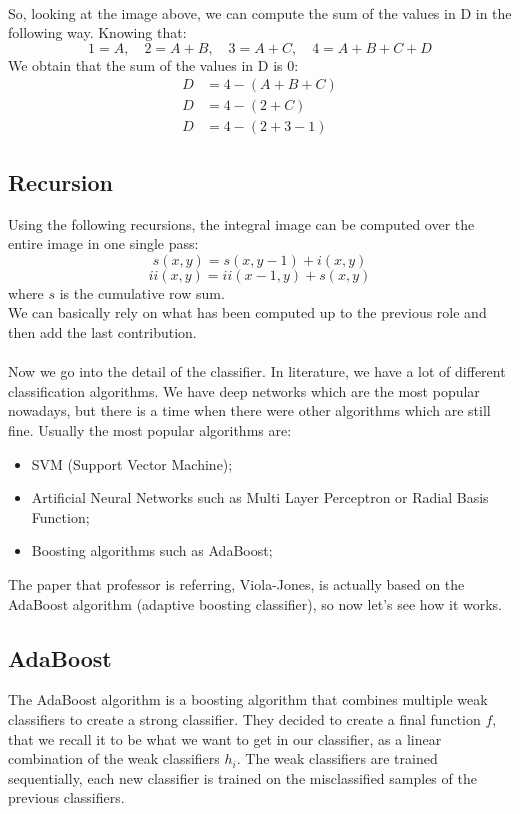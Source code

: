 \\So, looking at the image above, we can compute the sum of the values in D in the following way.
Knowing that: 
\[1 = A,\quad 2 = A + B,\quad 3 = A + C,\quad 4 = A + B + C + D\]
We obtain that the sum of the values in D is $0$:
\begin{equation}
    \begin{split}
        D & = 4 - (A + B + C) \\
        D & = 4 - (2 + C) \\
        D & = 4 - (2 + 3 - 1) 
    \end{split}
\end{equation}
\subsection{Recursion}
Using the following recursions, the integral image can be computed over the entire image in one single pass:
\[s(x,y)=s(x,y-1)+i(x,y)\]
\[ii(x,y)=ii(x-1,y)+s(x,y)\]
where $s$ is the cumulative row sum.
\\We can basically rely on what has been computed up to the previous role and then add the last contribution.
\\
\\
Now we go into the detail of the classifier. In literature, we have a lot of different classification algorithms. We have deep networks which are the most popular nowadays, but there is a time when there were other algorithms which are still fine.
Usually the most popular algorithms are:
\begin{itemize}
    \item SVM (Support Vector Machine);
    \item Artificial Neural Networks such as Multi Layer Perceptron or Radial Basis Function;
    \item Boosting algorithms such as AdaBoost;
\end{itemize}
The paper that professor is referring, Viola-Jones, is actually based on the AdaBoost algorithm (adaptive boosting classifier), so now let's see how it works.
\subsection{AdaBoost}
The AdaBoost algorithm is a boosting algorithm that combines multiple weak classifiers to create a strong classifier.
They decided to create a final function $f$, that we recall it to be what we want to get in our classifier, as a linear combination of the weak classifiers $h_i$.
The weak classifiers are trained sequentially, each new classifier is trained on the misclassified samples of the previous classifiers.

